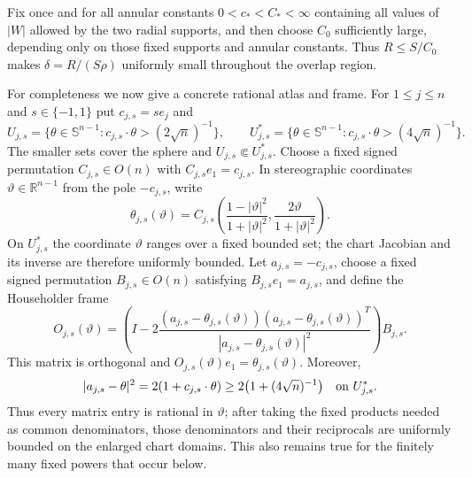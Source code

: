 \documentclass[11pt]{article}
\numberwithin{equation}{section}
\theoremstyle{remark}
\theoremstyle{definition}
\newcommand{\Sph}{\mathbb S}
\begin{document}
Fix once and for all annular constants \(0<c_*<C_*<\infty\) containing
all values of \(|W|\) allowed by the two radial supports, and then choose
\(C_0\) sufficiently large, depending only on those fixed supports and
annular constants.  Thus \(R\le S/C_0\) makes
\(\delta=R/(S\rho)\) uniformly small throughout the overlap region.

For completeness we now give a concrete rational atlas and frame.  For
\(1\le j\le n\) and \(s\in\{-1,1\}\) put \(c_{j,s}=se_j\) and
\[
 U_{j,s}=\{\theta\in\Sph^{n-1}:c_{j,s}\cdot\theta>(2\sqrt n)^{-1}\},
 \qquad
 U_{j,s}^*=\{\theta\in\Sph^{n-1}:c_{j,s}\cdot\theta>(4\sqrt n)^{-1}\}.
\]
The smaller sets cover the sphere and
\(U_{j,s}\Subset U_{j,s}^*\).  Choose a fixed signed permutation
\(C_{j,s}\in O(n)\) with \(C_{j,s}e_1=c_{j,s}\).  In stereographic
coordinates \(\vartheta\in\mathbb R^{n-1}\) from the pole \(-c_{j,s}\),
write
\[
 \theta_{j,s}(\vartheta)
 =C_{j,s}\left(
   \frac{1-|\vartheta|^2}{1+|\vartheta|^2},
   \frac{2\vartheta}{1+|\vartheta|^2}
  \right).
\]
On \(U_{j,s}^*\) the coordinate \(\vartheta\) ranges over a fixed bounded
set; the chart Jacobian and its inverse are therefore uniformly bounded.
Let \(a_{j,s}=-c_{j,s}\), choose a fixed signed permutation
\(B_{j,s}\in O(n)\) satisfying \(B_{j,s}e_1=a_{j,s}\), and define the
Householder frame
\begin{equation}\label{eq:rational-householder-frame}
 O_{j,s}(\vartheta)
 =\left(I-2\frac{(a_{j,s}-\theta_{j,s}(\vartheta))
 (a_{j,s}-\theta_{j,s}(\vartheta))^T}
 {|a_{j,s}-\theta_{j,s}(\vartheta)|^2}\right)B_{j,s}.
\end{equation}
This matrix is orthogonal and
\(O_{j,s}(\vartheta)e_1=\theta_{j,s}(\vartheta)\).  Moreover,
\[
 |a_{j,s}-\theta|^2=2(1+c_{j,s}\cdot\theta)
 \ge2\bigl(1+(4\sqrt n)^{-1}\bigr)
 \quad\hbox{on }U_{j,s}^*.
\]
Thus every matrix entry is rational in \(\vartheta\); after taking the
fixed products needed as common denominators, those denominators and their
reciprocals are uniformly bounded on the enlarged chart domains.  This
also remains true for the finitely many fixed powers that occur below.
\end{document}
